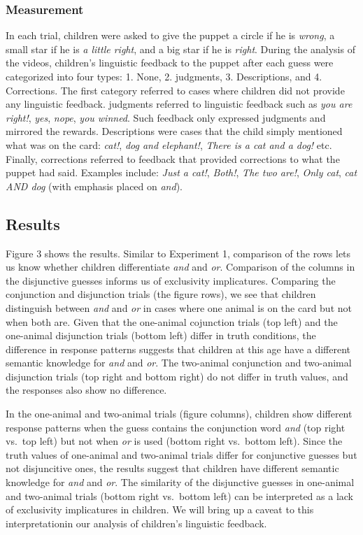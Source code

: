 \documentclass[10pt, letterpaper]{article}
\begin{document}
\subsubsection{Measurement}\label{measurement}

In each trial, children were asked to give the puppet a circle if he is
\emph{wrong}, a small star if he is \emph{a little right}, and a big
star if he is \emph{right}. During the analysis of the videos,
children's linguistic feedback to the puppet after each guess were
categorized into four types: 1. None, 2. judgments, 3. Descriptions, and
4. Corrections. The first category referred to cases where children did
not provide any linguistic feedback. judgments referred to linguistic
feedback such as \emph{you are right!}, \emph{yes}, \emph{nope},
\emph{you winned}. Such feedback only expressed judgments and mirrored
the rewards. Descriptions were cases that the child simply mentioned
what was on the card: \emph{cat!}, \emph{dog and elephant!}, \emph{There
is a cat and a dog!} etc. Finally, corrections referred to feedback that
provided corrections to what the puppet had said. Examples include:
\emph{Just a cat!}, \emph{Both!}, \emph{The two are!}, \emph{Only cat},
\emph{cat AND dog} (with emphasis placed on \emph{and}).

\subsection{Results}\label{results-1}

Figure 3 shows the results. Similar to Experiment 1, comparison of the
rows lets us know whether children differentiate \emph{and} and
\emph{or}. Comparison of the columns in the disjunctive guesses informs
us of exclusivity implicatures. Comparing the conjunction and
disjunction trials (the figure rows), we see that children distinguish
between \emph{and} and \emph{or} in cases where one animal is on the
card but not when both are. Given that the one-animal cojunction trials
(top left) and the one-animal disjunction trials (bottom left) differ in
truth conditions, the difference in response patterns suggests that
children at this age have a different semantic knowledge for \emph{and}
and \emph{or}. The two-animal conjunction and two-animal disjunction
trials (top right and bottom right) do not differ in truth values, and
the responses also show no difference.

In the one-animal and two-animal trials (figure columns), children show
different response patterns when the guess contains the conjunction word
\emph{and} (top right vs.~top left) but not when \emph{or} is used
(bottom right vs.~bottom left). Since the truth values of one-animal and
two-animal trials differ for conjunctive guesses but not disjuncitive
ones, the results suggest that children have different semantic
knowledge for \emph{and} and \emph{or}. The similarity of the
disjunctive guesses in one-animal and two-animal trials (bottom right
vs.~bottom left) can be interpreted as a lack of exclusivity
implicatures in children. We will bring up a caveat to this
interpretationin our analysis of children's linguistic feedback.
\end{document}
